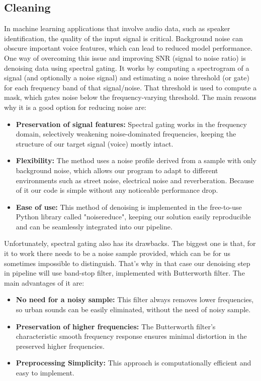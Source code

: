 \documentclass[11pt, letterpaper]{article}
\begin{document}
\subsection{Cleaning}
In machine learning applications that involve audio data, such as speaker identification, the quality of the input signal is critical. Background noise can obscure important voice features, which can lead to reduced model performance. One way of overcoming this issue and improving SNR (signal to noise ratio) is denoising data using spectral gating. It works by computing a spectrogram of a signal (and optionally a noise signal) and estimating a noise threshold (or gate) for each frequency band of that signal/noise.
That threshold is used to compute a mask, which gates noise below the frequency-varying threshold. The main reasons why it is a good option for reducing noise are:
\begin{itemize}
    \item \textbf{Preservation of signal features:}
        Spectral gating works in the frequency domain, selectively weakening noise-dominated frequencies, keeping the structure of our target signal (voice) mostly intact.
    \item \textbf{Flexibility:}
        The method uses a noise profile derived from a sample with only background noise, which allows our program to adapt to different environments such as street noise, electrical noise and reverberation. Because of it our code is simple without any noticeable performance drop.
    \item \textbf{Ease of use:}
        This method of denoising is implemented in the free-to-use Python library called "noisereduce", keeping our solution easily reproducible and can be seamlessly integrated into our pipeline.
\end{itemize}
Unfortunately, spectral gating also has its drawbacks. The biggest one is that, for it to work there needs to be a noise sample provided, which can be for us sometimes impossible to distinguish. That's why in that case our denoising step in pipeline will use band-stop filter, implemented with Butterworth filter. The main advantages of it are:
\begin{itemize}
    \item \textbf{No need for a noisy sample:}
        This filter always removes lower frequencies, so urban sounds can be easily eliminated, without the need of noisy sample.
    \item \textbf{Preservation of higher frequencies:}
        The Butterworth filter's characteristic smooth frequency response ensures minimal distortion in the preserved higher frequencies.
    \item \textbf{Preprocessing Simplicity:}
        This approach is computationally efficient and easy to implement.
\end{itemize}
\end{document}
